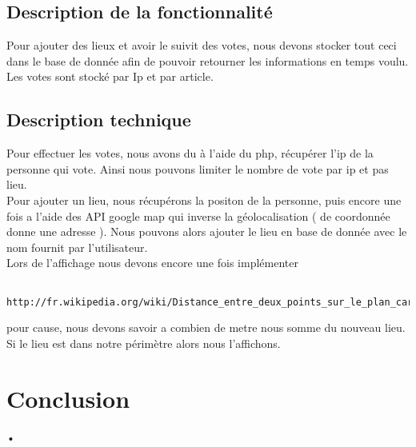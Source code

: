 \documentclass[10pt,a4paper]{report}
\begin{document}
\subsection{Description de la fonctionnalité}
\begin{flushleft}
Pour ajouter des lieux et avoir le suivit des votes, nous devons stocker tout ceci dans le base de donnée afin de pouvoir retourner les informations en temps voulu. \\

Les votes sont stocké par Ip et par article. \\
\end{flushleft}

\subsection{Description technique}
\begin{flushleft}
Pour effectuer les votes, nous avons du à l'aide du php, récupérer l'ip de la personne qui vote. Ainsi nous pouvons limiter le nombre de vote par ip et pas lieu. \\

Pour ajouter un lieu, nous récupérons la positon de la personne, puis encore une fois a l'aide des API google map qui inverse la géolocalisation ( de coordonnée donne une adresse ). Nous pouvons alors ajouter le lieu en base de donnée avec le nom fournit par l'utilisateur. \\

Lors de l'affichage nous devons encore une fois implémenter 
\begin{verbatim}
	http://fr.wikipedia.org/wiki/Distance_entre_deux_points_sur_le_plan_cart%C3%A9sien
\end{verbatim} 
pour cause, nous devons savoir a combien de metre nous somme du nouveau lieu.
Si le lieu est dans  notre périmètre alors nous l'affichons.\\
\end{flushleft}



\section{Conclusion}
\begin{flushleft}
•
\end{flushleft}
\end{document}
